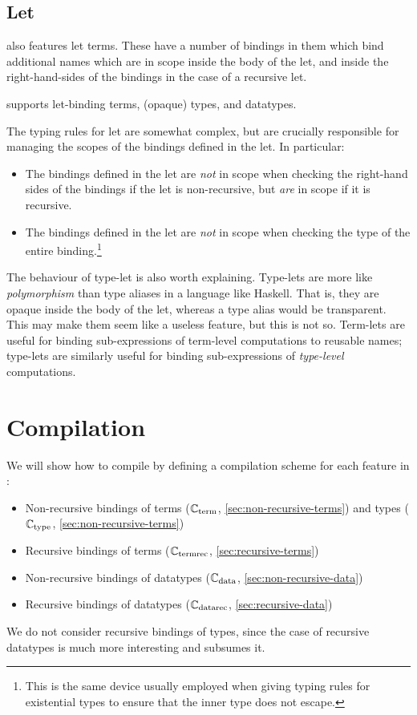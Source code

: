 \subsection{Let}

\FIR{} also features let terms. These have a number of
bindings in them which bind additional names which are in scope inside the body
of the let, and inside the right-hand-sides of the bindings in the case of a
recursive let.

\FIR{} supports let-binding terms, (opaque) types, and datatypes.

The typing rules for let are somewhat complex, but are crucially responsible for
managing the scopes of the bindings defined in the let. In particular:
\begin{itemize}
\item The bindings defined in the let are \emph{not} in scope when checking
  the right-hand sides of the bindings if the let is non-recursive, but
  \emph{are} in scope if it is recursive.
\item The bindings defined in the let are \emph{not} in scope when checking
  the type of the entire binding.\footnote{This is the same device usually employed when
    giving typing rules for existential types to ensure that the inner type does
    not escape.}
\end{itemize}

The behaviour of type-let is also worth explaining. Type-lets are more like
\emph{polymorphism} than type aliases in a language like Haskell. That is, they
are opaque inside the body of the let, whereas a type alias would be
transparent.
This may make them seem like a useless feature, but this is not so.
Term-lets are useful for binding sub-expressions of
term-level computations to reusable names; type-lets are similarly useful for binding
sub-expressions of \emph{type-level} computations.

\section{Compilation}

We will show how to compile \FIR{} by defining a compilation scheme for each
feature in \FIR{}:
\begin{itemize}
\item Non-recursive bindings of terms ($\mathbb{C}_{\mathrm{term}}$, \cref{sec:non-recursive-terms}) and types ($\mathbb{C}_{\mathrm{type}}$, \cref{sec:non-recursive-terms})
\item Recursive bindings of terms ($\mathbb{C}_{\mathrm{termrec}}$, \cref{sec:recursive-terms})
\item Non-recursive bindings of datatypes ($\mathbb{C}_{\mathrm{data}}$, \cref{sec:non-recursive-data})
\item Recursive bindings of datatypes ($\mathbb{C}_{\mathrm{datarec}}$, \cref{sec:recursive-data})
\end{itemize}
We do not consider recursive bindings of types, since the case of recursive datatypes is
much more interesting and subsumes it.

